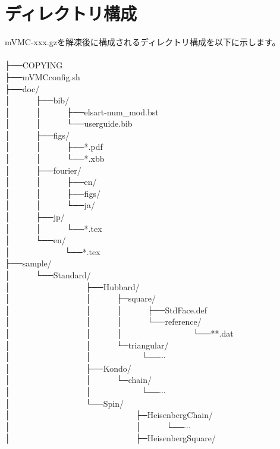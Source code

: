 \section{ディレクトリ構成}
mVMC-xxx.gzを解凍後に構成されるディレクトリ構成を以下に示します。\\
\\
├──COPYING\\
├──mVMCconfig.sh\\
├──doc/\\
│~~~~~~├──bib/\\
│~~~~~~│~~~~~~├──elsart-num\_mod.bst\\
│~~~~~~│~~~~~~└──userguide.bib\\
│~~~~~~├──figs/\\
│~~~~~~│~~~~~~├──*.pdf\\
│~~~~~~│~~~~~~└──*.xbb\\
│~~~~~~├──fourier/\\
│~~~~~~│~~~~~~├──en/\\
│~~~~~~│~~~~~~├──figs/\\
│~~~~~~│~~~~~~└──ja/\\
│~~~~~~├──jp/\\
│~~~~~~│~~~~~~└──*.tex\\
│~~~~~~└──en/\\
│~~~~~~~~~~~~~└──*.tex\\
├──sample/\\
│~~~~~~└──Standard/\\
│~~~~~~~~~~~~~~~~~~├──Hubbard/\\
│~~~~~~~~~~~~~~~~~~│~~~~~~├─square/\\
│~~~~~~~~~~~~~~~~~~│~~~~~~│~~~~~~├──StdFace.def\\
│~~~~~~~~~~~~~~~~~~│~~~~~~│~~~~~~└──reference/\\
│~~~~~~~~~~~~~~~~~~│~~~~~~│~~~~~~~~~~~~~~~~~└──**.dat\\
│~~~~~~~~~~~~~~~~~~│~~~~~~└─triangular/\\
│~~~~~~~~~~~~~~~~~~│~~~~~~~~~~~~└──$\cdots$\\
│~~~~~~~~~~~~~~~~~~├──Kondo/\\
│~~~~~~~~~~~~~~~~~~│~~~~~~└─chain/\\
│~~~~~~~~~~~~~~~~~~│~~~~~~~~~~~~└──$\cdots$\\
│~~~~~~~~~~~~~~~~~~└──Spin/\\
│~~~~~~~~~~~~~~~~~~~~~~~~~~~~~~├─HeisenbergChain/\\
│~~~~~~~~~~~~~~~~~~~~~~~~~~~~~~│~~~~~~└──$\cdots$\\
│~~~~~~~~~~~~~~~~~~~~~~~~~~~~~~├─HeisenbergSquare/\\
